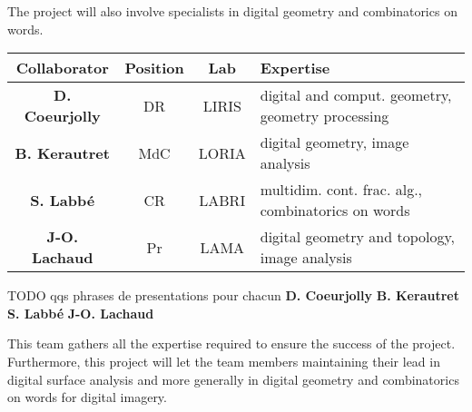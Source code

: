 The project will also involve specialists in digital geometry and combinatorics on words. 
\begin{table}[h]
\small
\centering
\begin{tabular}{|cccl|}
\hline
Collaborator & Position & Lab & Expertise \\ \hline
\hline
\textbf{D. Coeurjolly} & DR & LIRIS & digital and comput. geometry, geometry processing \\ \hline
\textbf{B. Kerautret} & MdC & LORIA & digital geometry, image analysis \\ \hline
\textbf{S. Labb\'{e}} & CR & LABRI & multidim. cont. frac. alg., combinatorics on words \\ \hline
\textbf{J-O. Lachaud} & Pr & LAMA & digital geometry and topology, image analysis \\ \hline
\hline
\end{tabular}
\normalsize
\end{table}

TODO qqs phrases de presentations pour chacun 
\textbf{D. Coeurjolly} 
\textbf{B. Kerautret} 
\textbf{S. Labb\'{e}} 
\textbf{J-O. Lachaud}


This team gathers all the expertise required to ensure the success of the project.
Furthermore, this project will let the team members maintaining their lead in digital surface analysis 
and more generally in digital geometry and combinatorics on words for digital imagery. 


